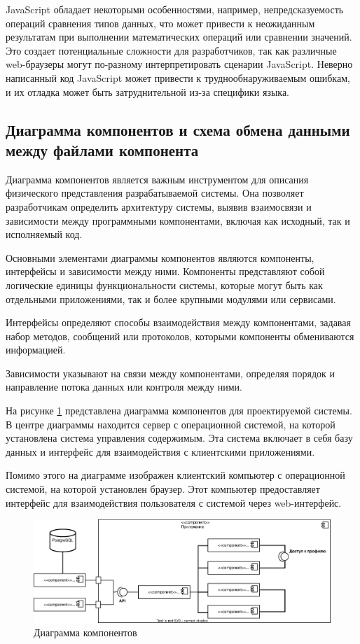 JavaScript обладает некоторыми особенностями, например, непредсказуемость операций сравнения типов данных, что может привести к неожиданным результатам при выполнении математических операций или сравнении значений. Это создает потенциальные сложности для разработчиков, так как различные web-браузеры могут по-разному интерпретировать сценарии JavaScript. Неверно написанный код JavaScript может привести к труднообнаруживаемым ошибкам, и их отладка может быть затруднительной из-за специфики языка.

\subsection{Диаграмма компонентов и схема обмена данными между файлами компонента}

Диаграмма компонентов является важным инструментом для описания физического представления разрабатываемой системы. Она позволяет разработчикам определить архитектуру системы, выявив взаимосвязи и зависимости между программными компонентами, включая как исходный, так и исполняемый код.

Основными элементами диаграммы компонентов являются компоненты, интерфейсы и зависимости между ними. Компоненты представляют собой логические единицы функциональности системы, которые могут быть как отдельными приложениями, так и более крупными модулями или сервисами.

Интерфейсы определяют способы взаимодействия между компонентами, задавая набор методов, сообщений или протоколов, которыми компоненты обмениваются информацией.

Зависимости указывают на связи между компонентами, определяя порядок и направление потока данных или контроля между ними.

На рисунке \ref{fig:comp} представлена диаграмма компонентов для проектируемой системы. В центре диаграммы находится сервер с операционной системой, на которой установлена система управления содержимым. Эта система включает в себя базу данных и интерфейс для взаимодействия с клиентскими приложениями.

Помимо этого на диаграмме изображен клиентский компьютер с операционной системой, на которой установлен браузер. Этот компьютер предоставляет интерфейс для взаимодействия пользователя с системой через web-интерфейс.

\begin{figure}
	\centering
	\includegraphics[width=1\linewidth]{images/comp}
	\caption{Диаграмма компонентов}
	\label{fig:comp}
\end{figure}

